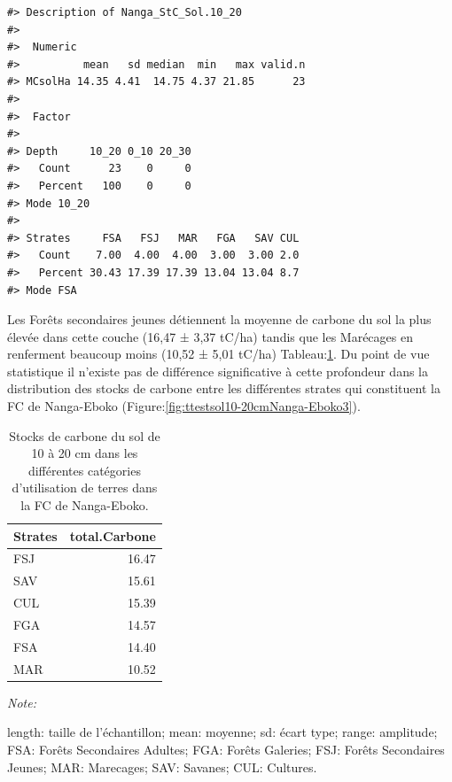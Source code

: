 \documentclass[
  12pt,
  a4paper,
  extrafontsizes,
  onecolumn,
  openright]{book}
\theoremstyle{definition}
\theoremstyle{definition}
\theoremstyle{definition}
\theoremstyle{definition}
\theoremstyle{remark}
\begin{document}
\begin{verbatim}
#> Description of Nanga_StC_Sol.10_20
#> 
#>  Numeric 
#>          mean   sd median  min   max valid.n
#> MCsolHa 14.35 4.41  14.75 4.37 21.85      23
#> 
#>  Factor 
#>          
#> Depth     10_20 0_10 20_30
#>   Count      23    0     0
#>   Percent   100    0     0
#> Mode 10_20 
#>          
#> Strates     FSA   FSJ   MAR   FGA   SAV CUL
#>   Count    7.00  4.00  4.00  3.00  3.00 2.0
#>   Percent 30.43 17.39 17.39 13.04 13.04 8.7
#> Mode FSA
\end{verbatim}

Les Forêts secondaires jeunes détiennent la moyenne de carbone du sol la plus élevée dans cette couche (16,47 ± 3,37 tC/ha) tandis que les Marécages en renferment beaucoup moins (10,52 ± 5,01 tC/ha) Tableau:\ref{tab:Stockscarbonesolde10-20cmNanga-Eboko3}. Du point de vue statistique il n'existe pas de différence significative à cette profondeur dans la distribution des stocks de carbone entre les différentes strates qui constituent la FC de Nanga-Eboko (Figure:\ref{fig:ttestsol10-20cmNanga-Eboko3}).

\begin{table}[H]
\centering
\caption{\label{tab:Stockscarbonesolde10-20cmNanga-Eboko3}Stocks de carbone du sol de 10 à 20 cm dans les différentes catégories d'utilisation de terres dans la FC de Nanga-Eboko.}
\centering
\begin{threeparttable}
\begin{tabular}[t]{lr}
\toprule
Strates & total.Carbone\\
\midrule
FSJ & 16.47\\
SAV & 15.61\\
CUL & 15.39\\
FGA & 14.57\\
FSA & 14.40\\
\addlinespace
MAR & 10.52\\
\bottomrule
\end{tabular}
\begin{tablenotes}
\item \textit{Note: } 
\item length: taille de l'échantillon; mean: moyenne; sd: écart type; range: amplitude; FSA: Forêts Secondaires Adultes; FGA: Forêts Galeries; FSJ: Forêts Secondaires Jeunes; MAR: Marecages; SAV: Savanes; CUL: Cultures.
\end{tablenotes}
\end{threeparttable}
\end{table}
\end{document}
